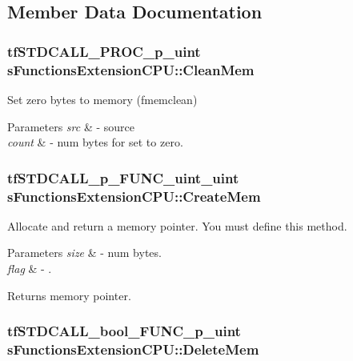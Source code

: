 \subsection{Member Data Documentation}
\hypertarget{structs_functions_extension_c_p_u_a42ccd4a8b9229287d01320c8745e3d87}{
\subsubsection[{Clean\-Mem}]{\setlength{\rightskip}{0pt plus 5cm}tf\-S\-T\-D\-C\-A\-L\-L\-\_\-\-P\-R\-O\-C\-\_\-p\-\_\-uint s\-Functions\-Extension\-C\-P\-U\-::\-Clean\-Mem}}\label{structs_functions_extension_c_p_u_a42ccd4a8b9229287d01320c8745e3d87}
Set zero bytes to memory (fmemclean) 
\begin{DoxyParams}{Parameters}
{\em src} & -\/ source \\
\hline
{\em count} & -\/ num bytes for set to zero. \\
\hline
\end{DoxyParams}
\hypertarget{structs_functions_extension_c_p_u_ac7091b06da7e6b3eca9876aec2a74db3}{
\subsubsection[{Create\-Mem}]{\setlength{\rightskip}{0pt plus 5cm}tf\-S\-T\-D\-C\-A\-L\-L\-\_\-p\-\_\-\-F\-U\-N\-C\-\_\-uint\-\_\-uint s\-Functions\-Extension\-C\-P\-U\-::\-Create\-Mem}}\label{structs_functions_extension_c_p_u_ac7091b06da7e6b3eca9876aec2a74db3}
Allocate and return a memory pointer. You must define this method. 
\begin{DoxyParams}{Parameters}
{\em size} & -\/ num bytes. \\
\hline
{\em flag} & -\/ . \\
\hline
\end{DoxyParams}
\begin{DoxyReturn}{Returns}
memory pointer. 
\end{DoxyReturn}
\hypertarget{structs_functions_extension_c_p_u_a759f2b1eb9ba156cb5106f50bcc3bb93}{
\subsubsection[{Delete\-Mem}]{\setlength{\rightskip}{0pt plus 5cm}tf\-S\-T\-D\-C\-A\-L\-L\-\_\-bool\-\_\-\-F\-U\-N\-C\-\_\-p\-\_\-uint s\-Functions\-Extension\-C\-P\-U\-::\-Delete\-Mem}}\label{structs_functions_extension_c_p_u_a759f2b1eb9ba156cb5106f50bcc3bb93}
